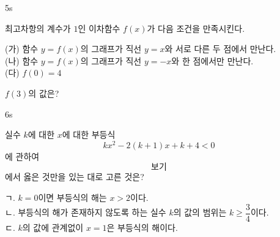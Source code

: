 \documentclass[10pt]{article}
\begin{document}
\begin{pagepair}

\begin{problem}{5}{s}
\par\smallskip
최고차항의 계수가 $1$인 이차함수 $f(x)$가 다음 조건을 만족시킨다.
\begin{conditions}
\setlength{\baselineskip}{1.4\baselineskip}
(가) 함수 $y = f(x)$의 그래프가 직선 $y = x$와 서로 다른 두 점에서 만난다. \\[4pt]
(나) 함수 $y = f(x)$의 그래프가 직선 $y = -x$와 한 점에서만 만난다. \\[4pt]
(다) $f(0) = 4$
\end{conditions}
$f(3)$의 값은?
\begin{choices}
\end{choices}
\end{problem}

\begin{problem}{6}{s}
\par\smallskip
실수 $k$에 대한 $x$에 대한 부등식
$$k x^2 - 2(k + 1)x + k + 4 < 0$$
에 관하여 \[보기\]에서 옳은 것만을 있는 대로 고른 것은?
\begin{conditions}
\setlength{\baselineskip}{1.4\baselineskip}
ㄱ. $k = 0$이면 부등식의 해는 $x > 2$이다. \\[6pt]
ㄴ. 부등식의 해가 존재하지 않도록 하는 실수 $k$의 값의 범위는 $k \ge \dfrac{3}{4}$이다. \\[6pt]
ㄷ. $k$의 값에 관계없이 $x = 1$은 부등식의 해이다.
\end{conditions}
\begin{choices}
\end{choices}
\end{problem}

\end{pagepair}
\end{document}
